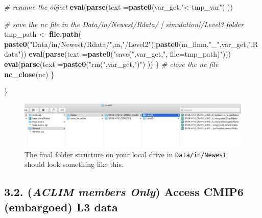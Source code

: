 \documentclass[
]{article}
\newenvironment{Shaded}{\begin{snugshade}}{\end{snugshade}}
\newcommand{\CommentTok}[1]{\textcolor[rgb]{0.56,0.35,0.01}{\textit{#1}}}
\newcommand{\DataTypeTok}[1]{\textcolor[rgb]{0.13,0.29,0.53}{#1}}
\newcommand{\KeywordTok}[1]{\textcolor[rgb]{0.13,0.29,0.53}{\textbf{#1}}}
\newcommand{\NormalTok}[1]{#1}
\newcommand{\StringTok}[1]{\textcolor[rgb]{0.31,0.60,0.02}{#1}}
\begin{document}
\begin{Shaded}
\begin{Highlighting}[]
                \CommentTok{# rename the object}
                \KeywordTok{eval}\NormalTok{(}\KeywordTok{parse}\NormalTok{(}\DataTypeTok{text =}\KeywordTok{paste0}\NormalTok{(var_get,}\StringTok{"<-tmp_var"}\NormalTok{) ))}
              
                \CommentTok{# save the nc file in the Data/in/Newest/Rdata/ [ simulation]/Level3 folder}
\NormalTok{                tmp_path <-}\StringTok{ }\KeywordTok{file.path}\NormalTok{( }\KeywordTok{paste0}\NormalTok{(}\StringTok{"Data/in/Newest/Rdata/"}\NormalTok{,m,}\StringTok{"/Level2"}\NormalTok{),}\KeywordTok{paste0}\NormalTok{(m_flnm,}\StringTok{"_"}\NormalTok{,var_get,}\StringTok{".Rdata"}\NormalTok{))}
                \KeywordTok{eval}\NormalTok{(}\KeywordTok{parse}\NormalTok{(}\DataTypeTok{text =}\KeywordTok{paste0}\NormalTok{(}\StringTok{"save("}\NormalTok{,var_get,}\StringTok{", file=tmp_path)"}\NormalTok{)))}
                \KeywordTok{eval}\NormalTok{(}\KeywordTok{parse}\NormalTok{(}\DataTypeTok{text =}\KeywordTok{paste0}\NormalTok{(}\StringTok{"rm("}\NormalTok{,var_get,}\StringTok{")"}\NormalTok{) ))}
\NormalTok{            \}}
            \CommentTok{# close the nc file}
            \KeywordTok{nc_close}\NormalTok{(nc)}
\NormalTok{      \}}
      
\NormalTok{  \}}
\end{Highlighting}
\end{Shaded}

\begin{figure}
\centering
\includegraphics[width=1\textwidth,height=\textheight]{Figs/filestructure.jpg}
\caption{The final folder structure on your local drive in
\texttt{Data/in/Newest} should look something like this.}
\end{figure}

\hypertarget{aclim-members-only-access-cmip6-embargoed-l3-data}{%
\subsection{\texorpdfstring{3.2. (\emph{ACLIM members Only}) Access
CMIP6 (embargoed) L3
data}{3.2. (ACLIM members Only) Access CMIP6 (embargoed) L3 data}}\label{aclim-members-only-access-cmip6-embargoed-l3-data}}
\end{document}
